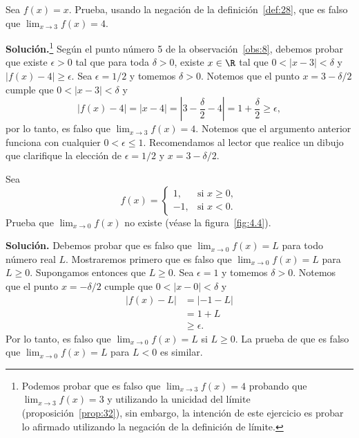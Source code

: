\documentclass[12pt,a4paper]{book}
\begin{document}
    \begin{ejemplo}\label{ejm:43}
        Sea $f(x)=x$. Prueba,
        usando la negación de la definición~\ref{def:28}, que es falso que $\lim_{x\to 3}f(x)=4$.

        \textbf{Solución.}\footnote{Podemos probar que es falso que $\lim_{x\to 3}f(x)=4$ probando que $\lim_{x\to 3}f(x)=3$ y
        utilizando la unicidad del límite (proposición~\ref{prop:32}), sin embargo, la intención de este ejercicio
        es probar lo afirmado utilizando la negación de la definición de límite.} Según el punto número 5 de la observación~\ref{obs:8}, debemos probar
        que existe $\epsilon>0$ tal que para toda $\delta>0$, existe $x\in\R$ tal que $0<|x-3|<\delta$
        y $|f(x)-4|\geq\epsilon$. Sea $\epsilon=1/2$ y tomemos $\delta>0$. Notemos que el punto
        $x=3-\delta/2$ cumple que $0<|x-3|<\delta$ y
        \begin{equation*}
            |f(x)-4|=|x-4|=\left|3-\frac{\delta}{2}-4\right|=1+\frac{\delta}{2}\geq\epsilon,
        \end{equation*}
        por lo tanto, es falso que $\lim_{x\to 3}f(x)=4$. Notemos que el argumento anterior
        funciona con cualquier $0<\epsilon\leq 1$. Recomendamos al lector que realice un
        dibujo que clarifique la elección de $\epsilon=1/2$ y $x=3-\delta/2$.
    \end{ejemplo}

    \begin{ejemplo}\label{ejm:44}
        Sea
        \begin{equation*}
            f(x)=\begin{cases}
                1, & \text{si }x\geq 0,\\
                -1, & \text{si }x<0.
            \end{cases}
        \end{equation*}
        Prueba que $\lim_{x\to 0}f(x)$ no existe (véase la figura~\ref{fig:4.4}).

        \textbf{Solución.} Debemos probar que es falso que $\lim_{x\to 0}f(x)=L$ para todo
        número real $L$. Mostraremos primero que es falso que $\lim_{x\to 0}f(x)=L$ para
        $L\geq 0$. Supongamos entonces que $L\geq 0$. Sea $\epsilon=1$ y tomemos $\delta>0$. Notemos
        que el punto $x=-\delta/2$ cumple que $0<|x-0|<\delta$ y
        \begin{align*}
            |f(x)-L|&=|-1-L|\\
            &=1+L\\
            &\geq\epsilon.
        \end{align*}
        Por lo tanto, es falso que $\lim_{x\to 0}f(x)=L$ si $L\geq 0$. La prueba de que es
        falso que $\lim_{x\to 0}f(x)=L$ para $L<0$ es similar.
    \end{ejemplo}
\end{document}

